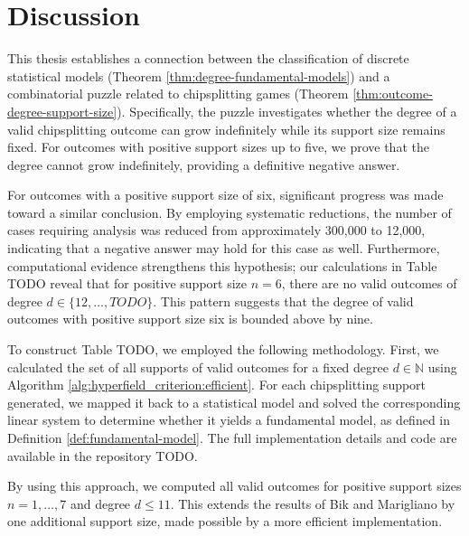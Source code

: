 \chapter{Discussion}

This thesis establishes a connection between the classification of discrete statistical models (Theorem \ref{thm:degree-fundamental-models}) and a combinatorial puzzle related to chipsplitting games (Theorem \ref{thm:outcome-degree-support-size}). Specifically, the puzzle investigates whether the degree of a valid chipsplitting outcome can grow indefinitely while its support size remains fixed. For outcomes with positive support sizes up to five, we prove that the degree cannot grow indefinitely, providing a definitive negative answer.

For outcomes with a positive support size of six, significant progress was made toward a similar conclusion. By employing systematic reductions, the number of cases requiring analysis was reduced from approximately 300,000 to 12,000, indicating that a negative answer may hold for this case as well. Furthermore, computational evidence strengthens this hypothesis; our calculations in Table TODO reveal that for positive support size $n=6$, there are no valid outcomes of degree $d \in \{12,\dots,TODO\}$. This pattern suggests that the degree of valid outcomes with positive support size six is bounded above by nine.

To construct Table TODO, we employed the following methodology. First, we calculated the set of all supports of valid outcomes for a fixed degree \( d\in \mathbb{N} \) using Algorithm \ref{alg:hyperfield_criterion:efficient}. For each chipsplitting support generated, we mapped it back to a statistical model and solved the corresponding linear system to determine whether it yields a fundamental model, as defined in Definition \ref{def:fundamental-model}. The full implementation details and code are available in the repository TODO.

By using this approach, we computed all valid outcomes for positive support sizes \( n = 1, \dots, 7 \) and degree \( d \leq 11 \). This extends the results of Bik and Marigliano \cite{bik2022classifying} by one additional support size, made possible by a more efficient implementation.